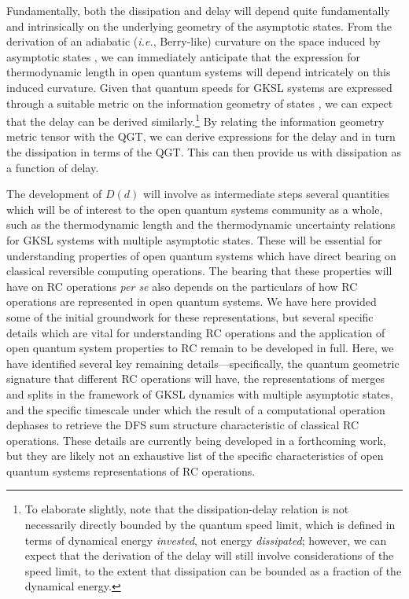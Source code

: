 \documentclass[preprints,article,accept,moreauthors,pdftex]{Definitions/mdpi}
\begin{document}
\begin{paracol}{2}
Fundamentally, both the dissipation and delay will depend quite fundamentally and intrinsically on the underlying geometry of the asymptotic states. From the derivation of an adiabatic (\emph{i.e.}, Berry-like) curvature on the space induced by asymptotic states \cite{ABFJ16, Albert18}, we can immediately anticipate that the expression for thermodynamic length in open quantum systems will depend intricately on this induced curvature. Given that quantum speeds for GKSL systems are expressed through a suitable metric on the information geometry of states \cite{DC17}, we can expect that the delay can be derived similarly.\footnote{To elaborate slightly, note that the dissipation-delay relation is not necessarily directly bounded by the quantum speed limit, which is defined in terms of dynamical energy \textit{invested}, not energy \textit{dissipated}; however, we can expect that the derivation of the delay will still involve considerations of the speed limit, to the extent that dissipation can be bounded as a fraction of the dynamical energy.} By relating the information geometry metric tensor with the QGT, we can derive expressions for the delay and in turn the dissipation in terms of the QGT. This can then provide us with dissipation as a function of delay. 

The development of $D\left(d\right)$ will involve as intermediate steps several quantities which will be of interest to the open quantum systems community as a whole, such as the thermodynamic length and the thermodynamic uncertainty relations for GKSL systems with multiple asymptotic states. These will be essential for understanding properties of open quantum systems which have direct bearing on classical reversible computing operations. The bearing that these properties will have on RC operations \emph{per se} also depends on the particulars of how RC operations are represented in open quantum systems. We have here provided some of the initial groundwork for these representations, but several specific details which are vital for understanding RC operations and the application of open quantum system properties to RC remain to be developed in full. Here, we have identified several key remaining details---specifically, the quantum geometric signature that different RC operations will have, the representations of merges and splits in the framework of GKSL dynamics with multiple asymptotic states, and the specific timescale under which the result of a computational operation dephases to retrieve the DFS sum structure characteristic of classical RC operations. These details are currently being developed in a forthcoming work, but they are likely not an exhaustive list of the specific characteristics of open quantum systems representations of RC operations.


\end{paracol}
\end{document}
